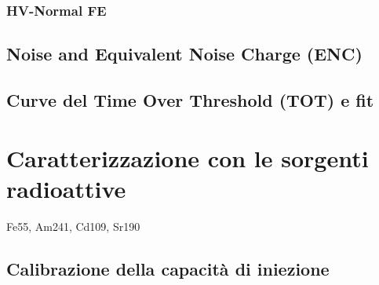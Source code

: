 \subsubsection{HV-Normal FE}

\begin{comment}
Il quarto ed ultimo flavor \textbf{HV-Normal} comprende 512 righe (0-511) per 32 colonne (448 -479) per un totale di 16384 pixel. Anche qui i registri sono stati settati ai valori riportati in tabella (ref). Di seguito in figura (ref), la S-curve su tutti i pixel e anche qui possiamo vedere diverso rumore a pixel noisy, non mascherati. In quest'ultimo flavor inoltre, le ultime 16 colonne non erano funzionanti, queste hanno restituito un picco di threshold a zero che è stato escluso dal plot della distribuzione delle threshold. Dunque in realtà in quest'ultimo pezzo della matrice, i pixel studiati sono stati la metà, ossia 8192.

\begin{figure}
\centering
\texttt{[image: all\_HV\_thscan\_140]}
\caption{S-curves di tutti i pixel del flavor HV Cascode della matrice con un impulso di iniezione di 140 DAC.}
\label{hv_scurve_140}
\end{figure}


Di seguito in figura (ref), i fit delle distribuzioni delle threshold per i due diversi impulsi di iniezione.

\begin{figure}
\centering
\subfigure[VH = 140 DAC]
{\texttt{[image: all\_HV\_thdist\_140]}}\quad
\subfigure[VH = 200 DAC]
{\includegraphics[scale=0.6{all_HV_thdist_200}}\\
\caption{Distribuzioni delle threshold prima della saturazione e alla saturazione massima.}
\label{thdist_hvc}
\end{figure}



\end{comment}


\subsection{Noise and Equivalent Noise Charge (ENC)}

\subsection{Curve del Time Over Threshold (TOT) e fit}

\section{Caratterizzazione con le sorgenti radioattive}

Fe55, Am241, Cd109, Sr190

\subsection{Calibrazione della capacità di iniezione}

